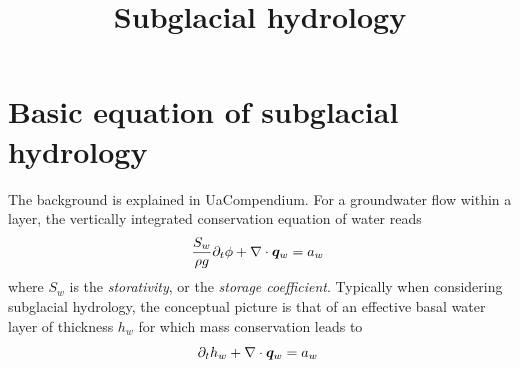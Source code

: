 \documentclass[10pt,a4paper]{article}
\begin{document}
\title{Subglacial hydrology}
\maketitle

\section{Basic equation of subglacial hydrology}
The background is explained in UaCompendium. For a groundwater flow
within a layer, the vertically integrated conservation equation of
water reads
\begin{equation}
  \frac{S_w}{\rho g} \partial_t \phi + \nabla \cdot \bm{q}_w  = a_w \; 
\label{eq:hydphi}
\end{equation}
where $S_w$ is the \emph{storativity}, or the \emph{storage
coefficient}. Typically when considering subglacial hydrology, the
conceptual picture is that of an effective basal water layer of thickness $h_w$ for which mass conservation leads to
\begin{equation}
  \partial_t h_w + \nabla \cdot \bm{q}_w  = a_w \; 
\label{eq:hwcon}
\end{equation}
\end{document}

